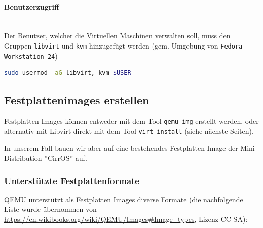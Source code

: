 \paragraph{Benutzerzugriff} \hfill \\
Der Benutzer, welcher die Virtuellen Maschinen verwalten soll, muss den Gruppen \lstinline|libvirt| und \lstinline|kvm| hinzugefügt werden (gem. Umgebung von \lstinline|Fedora Workstation 24|)
\begin{lstlisting}[language=bash]
sudo usermod -aG libvirt, kvm $USER
\end{lstlisting}

\subsection{Festplattenimages erstellen}\label{sec:festplattenimages-erstellen}
Festplatten-Images können entweder mit dem Tool \lstinline|qemu-img| erstellt werden, oder alternativ mit Libvirt direkt mit dem Tool \lstinline|virt-install| (siehe nächste Seiten).

In unserem Fall bauen wir aber auf eine bestehendes Festplatten-Image der Mini-Distribution ''CirrOS'' auf.

\subsubsection{Unterstützte Festplattenformate}
QEMU unterstützt als Festplatten Images diverse Formate (die nachfolgende Liste wurde übernommen von \url{https://en.wikibooks.org/wiki/QEMU/Images#Image_types}, Lizenz CC-SA):

